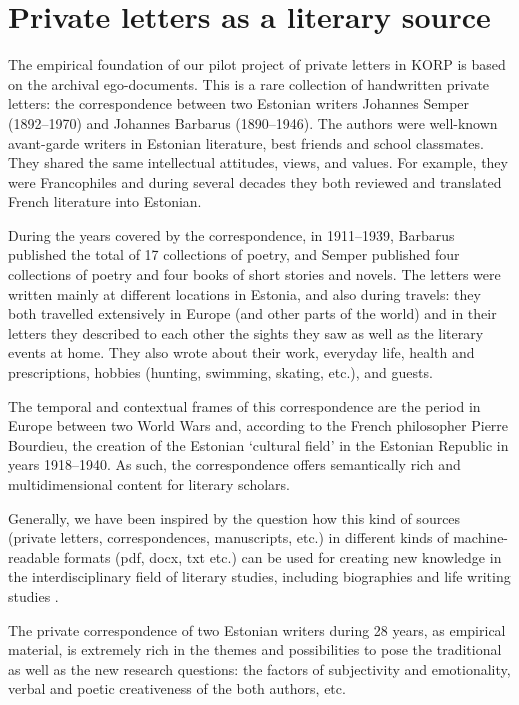 \documentclass[runningheads]{llncs}
\begin{document}
\section{Private letters as a literary source}

The empirical foundation of our pilot project of private letters in KORP is based on the archival ego-documents. This is a rare collection of handwritten private letters: the correspondence between two Estonian writers Johannes Semper (1892--1970) and Johannes Barbarus (1890--1946). The authors were well-known avant-garde writers in Estonian literature, best friends and school classmates. They shared the same intellectual attitudes, views, and values. For example, they were Francophiles and during several decades they both reviewed and translated French literature into Estonian. 

During the years covered by the correspondence, in 1911--1939, Barbarus published the total of 17 collections of poetry, and Semper published four collections of poetry and four books of short stories and novels. The letters were written mainly at different locations in Estonia, and also during travels: they both travelled extensively in Europe (and other parts of the world) and in their letters they described to each other the sights they saw as well as the literary events at home. They also wrote about their work, everyday life, health and prescriptions, hobbies (hunting, swimming, skating, etc.), and guests. 

The temporal and contextual frames of this correspondence are the period in Europe between two World Wars and, according to the French philosopher Pierre Bourdieu, the creation of  the Estonian ‘cultural field’ in the Estonian Republic in years 1918--1940. As such, the correspondence offers semantically rich and multidimensional content for literary scholars.  

Generally, we have been inspired by the question how this kind of sources (private letters, correspondences, manuscripts, etc.) in different kinds of machine-readable formats (pdf, docx, txt etc.) can be used for creating new knowledge in the interdisciplinary field of literary studies, including biographies and life writing studies \cite{2015}. 

The private correspondence of two Estonian writers during 28 years, as empirical material, is extremely rich in the themes and possibilities to pose the traditional as well as the new research questions: the factors of subjectivity and emotionality, verbal and poetic creativeness of the both authors, etc.  
\end{document}
